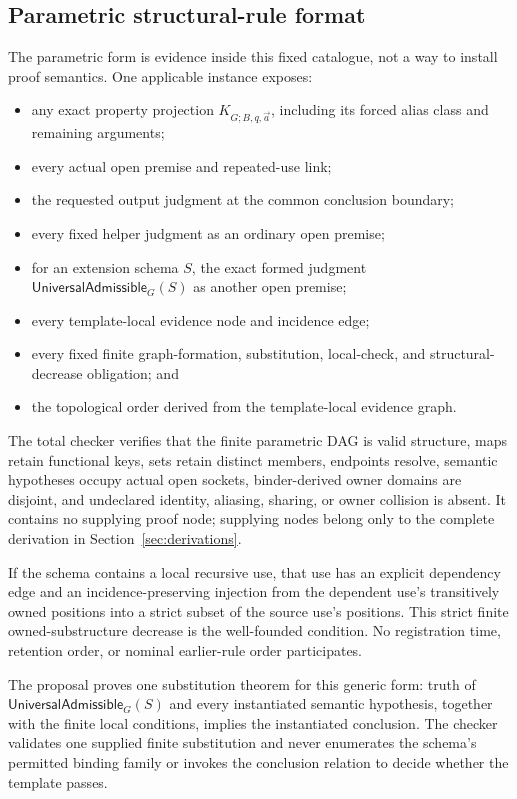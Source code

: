 \documentclass[11pt,twoside]{article}
\newcommand{\UniversalAdmissible}{\mathsf{UniversalAdmissible}}
\begin{document}
\subsection{Parametric structural-rule format}

The parametric form is evidence inside this fixed catalogue, not a way to install
proof semantics.  One applicable instance exposes:

\begin{itemize}[leftmargin=2em]
  \item any exact property projection \(K_{G;B,q,\vec a}\), including its forced
        alias class and remaining arguments;
  \item every actual open premise and repeated-use link;
  \item the requested output judgment at the common conclusion boundary;
  \item every fixed helper judgment as an ordinary open premise;
  \item for an extension schema \(S\), the exact formed judgment
        \(\UniversalAdmissible_G(S)\) as another open premise;
  \item every template-local evidence node and incidence edge;
  \item every fixed finite graph-formation, substitution, local-check, and
        structural-decrease obligation; and
  \item the topological order derived from the template-local evidence graph.
\end{itemize}

The total checker verifies that the finite parametric DAG is valid structure, maps
retain functional keys, sets retain distinct members, endpoints resolve, semantic
hypotheses occupy actual open sockets, binder-derived owner domains are disjoint,
and undeclared identity, aliasing, sharing, or owner collision is absent.  It
contains no supplying proof node; supplying nodes belong only to the complete
derivation in Section~\ref{sec:derivations}.

If the schema contains a local recursive use, that use has an explicit dependency
edge and an incidence-preserving injection from the dependent use's transitively
owned positions into a strict subset of the source use's positions.  This strict
finite owned-substructure decrease is the well-founded condition.  No registration
time, retention order, or nominal earlier-rule order participates.

The proposal proves one substitution theorem for this generic form: truth of
\(\UniversalAdmissible_G(S)\) and every instantiated semantic hypothesis, together
with the finite local conditions, implies the instantiated conclusion.  The
checker validates one supplied finite substitution and never enumerates the
schema's permitted binding family or invokes the conclusion relation to decide
whether the template passes.
\end{document}
